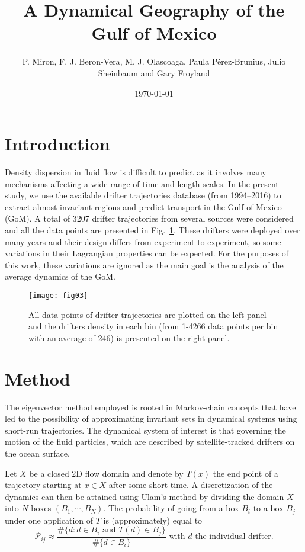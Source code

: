 \documentclass[final]{beamer}
\title
[Gulf of Mexico Oil Spill \& Ecosystem Science Conference, February 5--10 2017,
New Orleans, USA] %
{ %
A Dynamical Geography of the Gulf of Mexico
}
\author{ %
P. Miron\inst{1}, %
F. J. Beron-Vera\inst{1},
M. J. Olascoaga\inst{1},
 Paula P\'erez-Brunius\inst{2}, 
 Julio Sheinbaum\inst{2} and 
 Gary Froyland\inst{3}
}
\institute
[Very Large University] %
{
\inst{1} Rosenstiel School of Marine and Atmospheric Science, University of
Miami, USA
\\[0.3ex]
\inst{2} CICESE, Ensenada, Mexico
\\[0.3ex]
\inst{3} University of New South Wales, Sydney, Australia
}
\date{\today}
\newcommand{\PF}{\mathcal{P}}
\newcommand{\gom}{GoM}
\begin{document}
\begin{frame}[t]
\begin{multicols}{3}

\section{Introduction}
Density dispersion in fluid flow is difficult to predict as it involves many
mechanisms affecting a wide range of time and length scales. In the present
study, we use the available drifter trajectories database (from 1994--2016) to
extract almost-invariant regions and predict transport in the Gulf of Mexico
(\gom). A total of 3207 drifter trajectories from several sources were
considered and all the data points are presented in Fig.~\ref{fig:gom}. These
drifters were deployed over many years and their design differs from experiment
to experiment, so some variations in their Lagrangian properties can be
expected.  For the purposes of this work, these variations are ignored as the
main goal is the analysis of the average dynamics of the \gom.
\begin{figure}
\centering
\texttt{[image: fig03]}
\caption{All data points of drifter trajectories are plotted on the left panel
and the drifters density in each bin (from 1-4266 data points per bin with an
average of 246) is presented on the right panel.}
\label{fig:gom}
\end{figure}

\section{Method}
The eigenvector method\citep{froyland2014well} employed is rooted in
Markov-chain concepts that have led to the possibility of approximating
invariant sets in dynamical systems using short-run
trajectories\citep{dellnitz1997almost}. The dynamical system of interest is
that governing the motion of the fluid particles, which are described by
satellite-tracked drifters on the ocean surface.

Let $X$ be a closed 2D flow domain and denote by $T(x)$ the end point of a
trajectory starting at $x \in X$ after some short time. A discretization of the
dynamics can then be attained using Ulam's method\citep{ulam1960,Froyland-01}
by dividing the domain $X$ into $N$ boxes $\left(B_1,\cdots,B_N\right)$. The
probability of going from a box  $B_i$ to a box $B_j$ under one application of
$T$ is (approximately) equal to
\begin{equation*}
\PF_{ij} \approx \frac{\#\lbrace d: d \in B_i \text{ and } T(d) \in
B_j\rbrace}{\#\lbrace d \in B_i\rbrace} \text{ with } d \text{ the individual
drifter.}
\end{equation*}


\end{multicols}
\end{frame}
\end{document}
